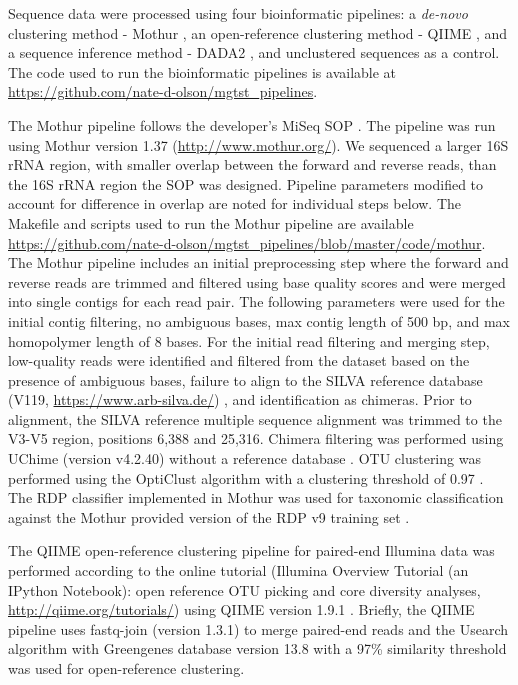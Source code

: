 \documentclass[linenumbers]{bmcart}
\begin{document}
Sequence data were processed using four bioinformatic pipelines: a
\emph{de-novo} clustering method - Mothur
\cite{schloss2009introducing}, an open-reference clustering method -
QIIME \cite{Caporaso2010}, and a sequence inference method - DADA2
\cite{callahan2016dada2}, and unclustered sequences as a control. The
code used to run the bioinformatic pipelines is available at
\url{https://github.com/nate-d-olson/mgtst_pipelines}.

The Mothur pipeline follows the developer's MiSeq SOP
\cite{schloss2009introducing, kozich2013development}. The pipeline was
run using Mothur version 1.37 (\url{http://www.mothur.org/}). We
sequenced a larger 16S rRNA region, with smaller overlap between the
forward and reverse reads, than the 16S rRNA region the SOP was
designed. Pipeline parameters modified to account for difference in
overlap are noted for individual steps below. The Makefile and scripts
used to run the Mothur pipeline are available
\url{https://github.com/nate-d-olson/mgtst_pipelines/blob/master/code/mothur}.
The Mothur pipeline includes an initial preprocessing step where the
forward and reverse reads are trimmed and filtered using base quality
scores and were merged into single contigs for each read pair. The
following parameters were used for the initial contig filtering, no
ambiguous bases, max contig length of 500 bp, and max homopolymer length
of 8 bases. For the initial read filtering and merging step, low-quality
reads were identified and filtered from the dataset based on the
presence of ambiguous bases, failure to align to the SILVA reference
database (V119, \url{https://www.arb-silva.de/}) \cite{quast2012silva},
and identification as chimeras. Prior to alignment, the SILVA reference
multiple sequence alignment was trimmed to the V3-V5 region, positions
6,388 and 25,316. Chimera filtering was performed using UChime (version
v4.2.40) without a reference database \cite{edgar2011uchime}. OTU
clustering was performed using the OptiClust algorithm with a clustering
threshold of 0.97 \cite{westcott2017opticlust}. The RDP classifier
implemented in Mothur was used for taxonomic classification against the
Mothur provided version of the RDP v9 training set
\cite{wang2007naive}.

The QIIME open-reference clustering pipeline for paired-end Illumina
data was performed according to the online tutorial (Illumina Overview
Tutorial (an IPython Notebook): open reference OTU picking and core
diversity analyses, \url{http://qiime.org/tutorials/}) using QIIME
version 1.9.1 \cite{Caporaso2010}. Briefly, the QIIME pipeline uses
fastq-join (version 1.3.1) to merge paired-end reads
\cite{aronesty2011ea} and the Usearch algorithm \cite{edgar2010search}
with Greengenes database version 13.8 with a 97\% similarity threshold
\cite{desantis2006greengenes} was used for open-reference clustering.
\end{document}
